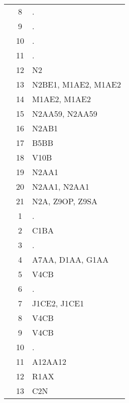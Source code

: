 \begin{table}[htbp]
\begin{tabular}{c c l}
	 & 8 & . \\
	 & 9 & . \\
	 & 10 & . \\
	 & 11 & . \\
	 & 12 & N2 \\
	 & 13 & N2BE1, M1AE2, M1AE2 \\
	 & 14 & M1AE2, M1AE2 \\
	 & 15 & N2AA59, N2AA59 \\
	 & 16 & N2AB1 \\
	 & 17 & B5BB \\
	 & 18 & V10B \\
	 & 19 & N2AA1 \\
	 & 20 & N2AA1, N2AA1 \\
	 & 21 & N2A, Z9OP, Z9SA \\
	\addlinespace
	8 & 1 & . \\
	 & 2 & C1BA \\
	 & 3 & . \\
	 & 4 & A7AA, D1AA, G1AA \\
	 & 5 & V4CB \\
	 & 6 & . \\
	 & 7 & J1CE2, J1CE1 \\
	 & 8 & V4CB \\
	 & 9 & V4CB \\
	 & 10 & . \\
	 & 11 & A12AA12 \\
	 & 12 & R1AX \\
	 & 13 & C2N \\
	\bottomrule
\end{tabular}
\end{table}


